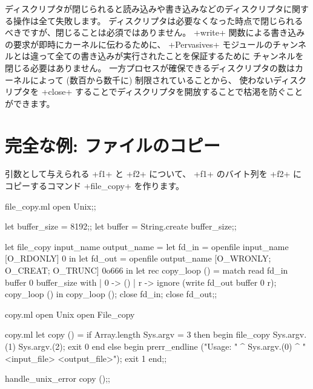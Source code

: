 ディスクリプタが閉じられると読み込みや書き込みなどのディスクリプタに関する操作は全て失敗します。
ディスクリプタは必要なくなった時点で閉じられるべきですが、閉じることは必須ではありません。
\ml+write+ 関数による書き込みの要求が即時にカーネルに伝わるために、
\ml+Pervasives+ モジュールのチャンネルとは違って全ての書き込みが実行されたことを保証するために
チャンネルを閉じる必要はありません。
一方プロセスが確保できるディスクリプタの数はカーネルによって (数百から数千に) 制限されていることから、
使わないディスクリプタを \ml+close+ することでディスクリプタを開放することで枯渇を防ぐことができます。

\section{\label{ex/filecopy}完全な例: ファイルのコピー}

引数として与えられる \ml+f1+ と \ml+f2+ について、
\ml+f1+ のバイト列を \ml+f2+ にコピーするコマンド \ml+file_copy+ を作ります。
%
\begin{listingcodefile}{file_copy.ml}
open Unix;;

let buffer_size = 8192;;
let buffer = String.create buffer_size;;

let file_copy input_name output_name =
  let fd_in = openfile input_name [O_RDONLY] 0 in
  let fd_out = openfile output_name [O_WRONLY; O_CREAT; O_TRUNC] 0o666 in
  let rec copy_loop () = match read fd_in buffer 0 buffer_size with
    |  0 -> ()
    | r -> ignore (write fd_out buffer 0 r); copy_loop ()
  in
  copy_loop ();
  close fd_in;
  close fd_out;;
\end{listingcodefile}
%
\begin{codefile}{copy.ml}
open Unix
open File_copy
\end{codefile}
%
\begin{listingcodefile}{copy.ml}
let copy () =
  if Array.length Sys.argv = 3 then begin
    file_copy Sys.argv.(1) Sys.argv.(2);
    exit 0
  end else begin
    prerr_endline
      ("Usage: " ^ Sys.argv.(0) ^ " <input_file> <output_file>");
    exit 1
  end;;

handle_unix_error copy ();;
\end{listingcodefile}
%

